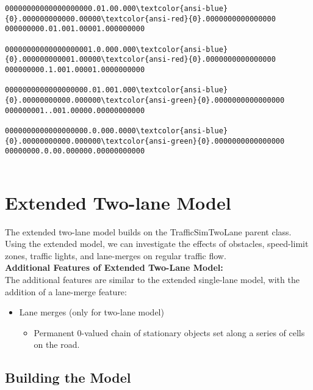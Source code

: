 \documentclass[11pt]{article}
\providecommand{\tightlist}{%
      \setlength{\itemsep}{0pt}\setlength{\parskip}{0pt}}
\begin{document}
\begin{Verbatim}[commandchars=\\\{\},fontsize=\footnotesize]
00000000000000000000.01.00.000\textcolor{ansi-blue}{0}.000000000000.00000\textcolor{ansi-red}{0}.0000000000000000
000000000.01.001.00001.000000000

00000000000000000001.0.000.000\textcolor{ansi-blue}{0}.000000000001.00000\textcolor{ansi-red}{0}.0000000000000000
000000000.1.001.00001.0000000000

0000000000000000000.01.001.000\textcolor{ansi-blue}{0}.00000000000.000000\textcolor{ansi-green}{0}.0000000000000000
000000001..001.00000.00000000000

0000000000000000000.0.000.0000\textcolor{ansi-blue}{0}.00000000000.000000\textcolor{ansi-green}{0}.0000000000000000
00000000.0.00.000000.00000000000


    \end{Verbatim}
\newpage
\section{Extended Two-lane Model}

The extended two-lane model builds on the TrafficSimTwoLane parent
class. Using the extended model, we can investigate the effects of
obstacles, speed-limit zones, traffic lights, and lane-merges on regular
traffic flow.\\

\textbf{Additional Features of Extended Two-Lane Model:}\\

The additional features are similar to the extended single-lane model,
with the addition of a lane-merge feature:

\begin{itemize}
\tightlist
\item
  Lane merges (only for two-lane model)

  \begin{itemize}
  \tightlist
  \item
    Permanent 0-valued chain of stationary objects set along a series of
    cells on the road.
  \end{itemize}
\end{itemize}

    \subsection{Building the Model}
\end{document}
